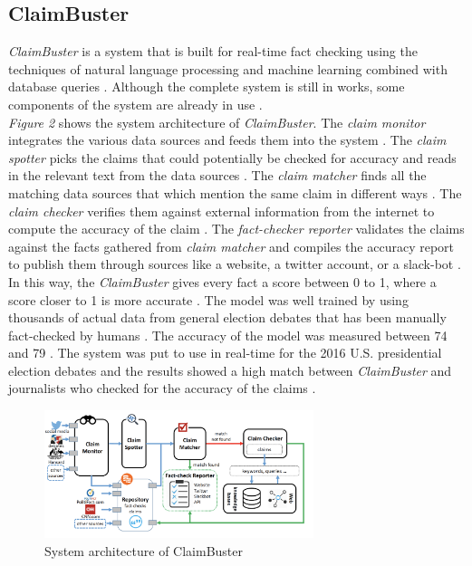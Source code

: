 \documentclass[sigconf]{acmart}
\begin{document}
\subsection{ClaimBuster}
{\em ClaimBuster} is a system that is built for real-time fact checking using the techniques of natural language processing and machine learning combined with database queries \cite{Claimbuster2017}. Although the complete system is still in works, some components of the system are already in use \cite{Claimbuster2017}.\\
{\em Figure 2} shows the system architecture of {\em ClaimBuster}. The {\em claim monitor} integrates the various data sources and feeds them into the system \cite{Claimbuster2017}. The {\em claim spotter} picks the claims that could potentially be checked for accuracy and reads in the relevant text from the data sources \cite{Claimbuster2017}. The {\em claim matcher} finds all the matching data sources that which mention the same claim in different ways \cite{Claimbuster2017}. The {\em claim checker} verifies them against external information from the internet to compute the accuracy of the claim \cite{Claimbuster2017}. The {\em fact-checker reporter} validates the claims against the facts gathered from {\em claim matcher} and compiles the accuracy report to publish them through sources like a website, a twitter account, or a slack-bot \cite{Claimbuster2017}. \\
In this way, the {\em ClaimBuster} gives every fact a score between 0 to 1, where a score closer to 1 is more accurate \cite{Claimbuster2017}. The model was well trained by using thousands of actual data from general election debates that has been manually fact-checked by humans \cite{Claimbuster2017}. The accuracy of the model was measured between 74 and 79 \cite{Claimbuster2017}. The system was put to use in real-time for the 2016 U.S. presidential election debates and the results showed a high match between {\em ClaimBuster} and journalists who checked for the accuracy of the claims \cite{Claimbuster2017}.  

\begin{figure}
\includegraphics[width=0.7\textwidth]{images/fig2.png}
\caption{System architecture of ClaimBuster \cite{Claimbuster2017}}
\end{figure}
\end{document}
